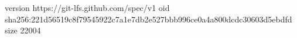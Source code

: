 version https://git-lfs.github.com/spec/v1
oid sha256:221d56519c8f79545922c7a1e7db2e527bbb996ce0a4a800dcdc30603d5ebdfd
size 22004
